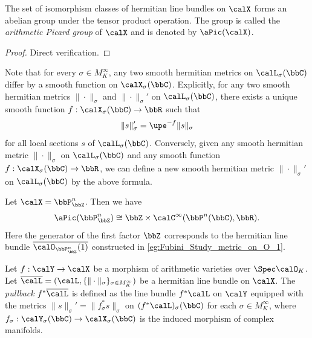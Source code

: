     \begin{proposition}\label{prop:arithmetic_picard_group}
        The set of isomorphism classes of hermitian line bundles on \(\calX\) forms an abelian group under the tensor product operation.
        The group is called the \emph{arithmetic Picard group} of \(\calX\) and is denoted by \(\aPic(\calX)\).
    \end{proposition}
    \begin{proof}
        Direct verification.
    \end{proof}

    Note that for every \(\sigma \in M_K^\infty\), 
    any two smooth hermitian metrics on \(\calL_\sigma(\bbC)\) differ by a smooth function on \(\calX_\sigma(\bbC)\).
    Explicitly, for any two smooth hermitian metrics \(\|\cdot\|_{\sigma}\) and \(\|\cdot\|_{\sigma}'\) on \(\calL_\sigma(\bbC)\),
    there exists a unique smooth function \(f: \calX_\sigma(\bbC) \to \bbR\) such that
    \[ \|s\|_{\sigma}' = \upe^{-f} \|s\|_{\sigma} \]
    for all local sections \(s\) of \(\calL_\sigma(\bbC)\).
    Conversely, given any smooth hermitian metric \(\|\cdot\|_{\sigma}\) on \(\calL_\sigma(\bbC)\)
    and any smooth function \(f: \calX_\sigma(\bbC) \to \bbR\),
    we can define a new smooth hermitian metric \(\|\cdot\|_{\sigma}'\) on \(\calL_\sigma(\bbC)\) by the above formula.

    \begin{example}\label{eg:arithmetic_picard_group_of_P^n_Z}
        Let \(\calX = \bbP^n_\bbZ\).
        Then we have 
        \[ \aPic(\bbP^n_\bbZ) \cong \bbZ \times \calC^\infty(\bbP^n(\bbC), \bbR). \]
        Here the generator of the first factor \(\bbZ\) corresponds to the hermitian line bundle \(\overline{\calO_{\bbP^n_\bbZ}(1)}\) constructed in \cref{eg:Fubini_Study_metric_on_O_1}.
    \end{example}


    \begin{definition}\label{def:pullback_of_hermitian_line_bundles}
        Let \(f: \calY \to \calX\) be a morphism of arithmetic varieties over \(\Spec \calO_K\).
        Let \(\overline{\calL} = (\calL, \{\|\cdot\|_\sigma\}_{\sigma \in M_K^\infty})\) be a hermitian line bundle on \(\calX\).
        The \emph{pullback} \(f^* \overline{\calL}\) is defined as the line bundle \(f^* \calL\) on \(\calY\)
        equipped with the metrics \(\|s\|_{\sigma}' = \|f_\sigma^* s\|_{\sigma}\) on \((f^* \calL)_\sigma(\bbC)\) for each \(\sigma \in M_K^\infty\),
        where \(f_\sigma: \calY_\sigma(\bbC) \to \calX_\sigma(\bbC)\) is the induced morphism of complex manifolds.
    \end{definition}


